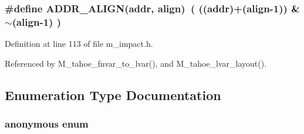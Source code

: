 \subsubsection{\setlength{\rightskip}{0pt plus 5cm}\#define ADDR\_\-ALIGN(addr, align)~( ((addr)+(align-1)) \& $\sim$(align-1) )}\label{m__impact_8h_6d086102bb3c719ca1cff92d03dccb3a}




Definition at line 113 of file m\_\-impact.h.

Referenced by M\_\-tahoe\_\-fnvar\_\-to\_\-lvar(), and M\_\-tahoe\_\-lvar\_\-layout().

\subsection{Enumeration Type Documentation}
\subsubsection{\setlength{\rightskip}{0pt plus 5cm}anonymous enum}\label{m__impact_8h_bed82baf7f470b522273a3e37c24c600}


